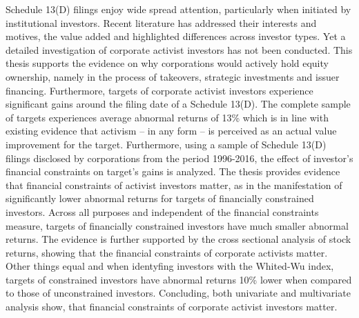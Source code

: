 \documentclass[12pt]{article}
\begin{document}
Schedule 13(D) filings enjoy wide spread attention, particularly when initiated by institutional investors. Recent literature has addressed their interests and motives, the value added and highlighted differences across investor types. Yet a detailed investigation of corporate activist investors has not been conducted. This thesis supports the evidence on why corporations would actively hold equity ownership, namely in the process of takeovers, strategic investments and issuer financing. Furthermore, targets of corporate activist investors experience significant gains around the filing date of a Schedule 13(D). The complete sample of targets experiences average abnormal returns of 13\% which is in line with existing evidence that activism -- in any form -- is perceived as an actual value improvement for the target. 
Furthermore, using a sample of Schedule 13(D) filings disclosed by corporations from the period 1996-2016, the effect of investor's financial constraints on target's gains is analyzed. The thesis provides evidence that financial constraints of activist investors matter, as in the manifestation of significantly lower abnormal returns for targets of financially constrained investors. Across all purposes and independent of the financial constraints measure, targets of financially constrained investors have much smaller abnormal returns. The evidence is further supported by the cross sectional analysis of stock returns, showing that the financial constraints of corporate activists matter. Other things equal and when identyfing investors with the Whited-Wu index, targets of constrained investors have abnormal returns 10\% lower when compared to those of unconstrained investors.
Concluding, both univariate and multivariate analysis show, that financial constraints of corporate activist investors matter. 
\end{document}
